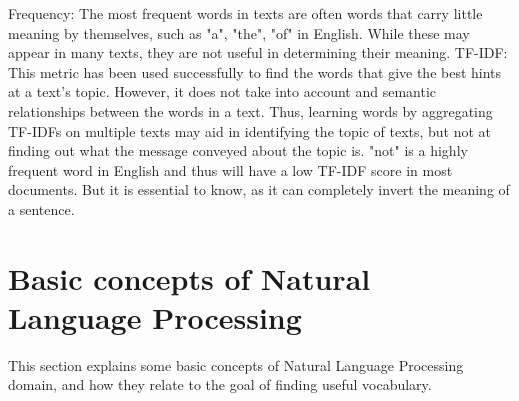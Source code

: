 Frequency: The most frequent words in texts are often words that carry little meaning by themselves, such as "a", "the", "of" in English.
While these may appear in many texts, they are not useful in determining their meaning.
TF-IDF: This metric has been used successfully to find the words that give the best hints at a text's topic.
However, it does not take into account and semantic relationships between the words in a text.
Thus, learning words by aggregating TF-IDFs on multiple texts may aid in identifying the topic of texts, but not at finding out what the message conveyed about the topic is.
"not" is a highly frequent word in English and thus will have a low TF-IDF score in most documents. But it is essential to know, as it can completely invert the meaning of a sentence.

\section{Basic concepts of Natural Language Processing} \label{basic-nlp-concepts}
This section explains some basic concepts of Natural Language Processing domain, and how they relate to the goal of finding useful vocabulary.


